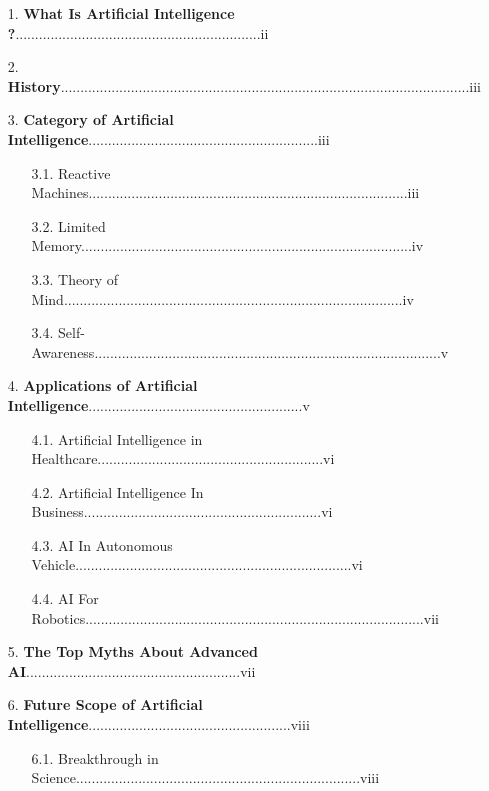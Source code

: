 \documentclass{article}
\begin{document}
\begin{itemize}
\item[1.]\textbf{What Is Artificial Intelligence ?}...............................................................ii
\item[2.]\textbf{History}.........................................................................................................iii
\item[3.]\textbf{Category of Artificial Intelligence}...........................................................iii
\begin{enumerate}
   \item[3.1.]Reactive Machines..................................................................................iii
   \item[3.2.]Limited Memory.....................................................................................iv
   \item[3.3.]Theory of Mind.......................................................................................iv
   \item[3.4.]Self-Awareness.........................................................................................v
\end{enumerate}
\item[4.]\textbf{Applications of Artificial Intelligence}.......................................................v
\begin{enumerate}
   \item[4.1.]Artificial Intelligence in Healthcare..........................................................vi
   \item[4.2.]Artificial Intelligence In Business.............................................................vi
   \item[4.3.]AI In Autonomous Vehicle.......................................................................vi
   \item[4.4.]AI For Robotics.......................................................................................vii
\end{enumerate}
\item[5.]\textbf{The Top Myths About Advanced AI}.......................................................vii
\item[6.]\textbf{Future Scope of Artificial Intelligence}....................................................viii
\begin{enumerate}
   \item[6.1.]Breakthrough in Science.........................................................................viii

\end{enumerate}
\end{itemize}
\end{document}
